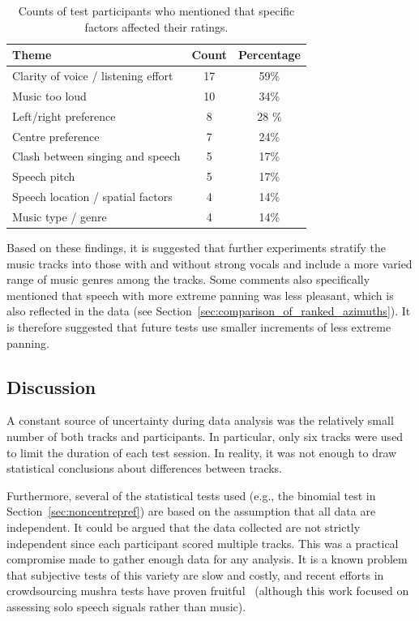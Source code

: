 \documentclass[a4paper,10pt]{edpsci} %
\begin{document}
\begin{table}[]
    \centering
    \begin{tabular}{lcc}
        \toprule
        Theme & Count & Percentage \\
        \midrule
        Clarity of voice / listening effort & 17 & 59\% \\
        Music too loud & 10 & 34\% \\
        Left/right preference & 8 & 28 \% \\
        Centre preference & 7 & 24\% \\
        Clash between singing and speech & 5 & 17\% \\
        Speech pitch & 5 & 17\% \\
        Speech location / spatial factors & 4 & 14\% \\
        Music type / genre & 4 & 14\% \\
        \bottomrule
    \end{tabular}
    \caption{Counts of test participants who mentioned that specific factors affected their ratings.}
    \label{table:freetextthemes}
\end{table}

Based on these findings, it is suggested that further experiments stratify the music tracks into those with and without strong vocals and include a more varied range of music genres among the tracks. Some comments also specifically mentioned that speech with more extreme panning was less pleasant, which is also reflected in the data (see Section~\ref{sec:comparison_of_ranked_azimuths}). It is therefore suggested that future tests use smaller increments of less extreme panning.


\subsection{Discussion}\label{Discussion}
A constant source of uncertainty during data analysis was the relatively small number of both tracks and participants. In particular, only six tracks were used to limit the duration of each test session. In reality, it was not enough to draw statistical conclusions about differences between tracks. 

Furthermore, several of the statistical tests used (e.g., the binomial test in Section~\ref{sec:noncentrepref}) are based on the assumption that all data are independent. It could be argued that the data collected are not strictly independent since each participant scored multiple tracks. This was a practical compromise made to gather enough data for any analysis. It is a known problem that subjective tests of this variety are slow and costly, and recent efforts in crowdsourcing \gls{mushra} tests have proven fruitful~\cite{lechlerCrowdsourcingMUSHRATests2025} (although this work focused on assessing solo speech signals rather than music).
\end{document}

